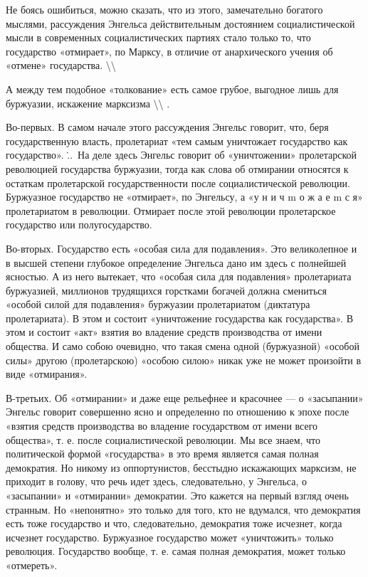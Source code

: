 \documentclass[12pt]{article}
\newcommand\ellipsis{%
  \textbackslash\thinspace\textellipsis\textbackslash
}
\newcommand{\parnum}{(\arabic{parcount})}
\newcounter{parcount}
\newenvironment{parnumbers}{%
  \par%
  \everypar{\noindent \stepcounter{parcount}\marginpar[]{\parnum}}%
}{}
\begin{document}
\begin{parnumbers}
Не боясь ошибиться, можно сказать, что из этого, замечательно богатого мыслями, рассуждения Энгельса действительным достоянием социалистической мысли в современных социалистических партиях стало только то, что государство «отмирает», по Марксу, в отличие от анархического учения об «отмене» государства. \ellipsis

А между тем подобное «толкование» есть самое грубое, выгодное лишь для буржуазии, искажение марксизма \ellipsis.

Во-первых. В самом начале этого рассуждения Энгельс говорит, что, беря государственную власть, пролетариат «тем самым уничтожает государство как государство». \...\ На деле здесь Энгельс говорит об «уничтожении» пролетарской революцией государства буржуазии, тогда как слова об отмирании относятся к остаткам пролетарской государственности после социалистической революции. Буржуазное государство не «отмирает», по Энгельсу, а «у н и ч m о ж а е m с я» пролетариатом в революции. Отмирает после этой революции пролетарское государство или полугосударство.

Во-вторых. Государство есть «особая сила для подавления». Это великолепное и в высшей степени глубокое определение Энгельса дано им здесь с полнейшей ясностью. А из него вытекает, что «особая сила для подавления» пролетариата буржуазией, миллионов трудящихся горстками богачей должна смениться «особой силой для подавления» буржуазии пролетариатом (диктатура пролетариата). В этом и состоит «уничтожение государства как государства». В этом и состоит «акт» взятия во владение средств производства от имени общества. И само собою очевидно, что такая смена одной (буржуазной) «особой силы» другою (пролетарскою) «особою силою» никак уже не может произойти в виде «отмирания».

В-третьих. Об «отмирании» и даже еще рельефнее и красочнее — о «засыпании» Энгельс говорит совершенно ясно и определенно по отношению к эпохе после «взятия средств производства во владение государством от имени всего общества», т. е. после социалистической революции. Мы все знаем, что политической формой «государства» в это время является самая полная демократия. Но никому из оппортунистов, бесстыдно искажающих марксизм, не приходит в голову, что речь идет здесь, следовательно, у Энгельса, о «засыпании» и «отмирании» демократии. Это кажется на первый взгляд очень странным. Но «непонятно» это только для того, кто не вдумался, что демократия есть тоже государство и что, следовательно, демократия тоже исчезнет, когда исчезнет государство. Буржуазное государство может «уничтожить» только революция. Государство вообще, т. е. самая полная демократия, может только «отмереть».


\end{parnumbers}
\end{document}

